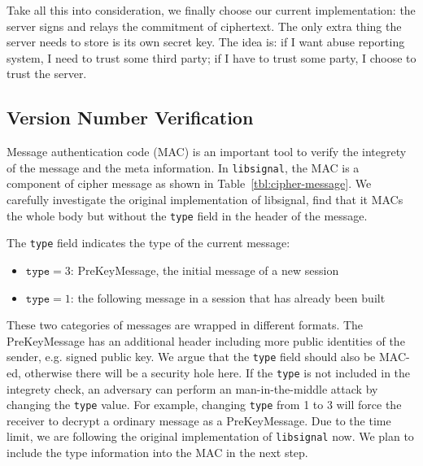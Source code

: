 Take all this into consideration, we finally choose our current implementation:
the server signs and relays the commitment of ciphertext.
The only extra thing the server needs to store is its own secret key.
The idea is: if I want abuse reporting system, I need to trust some third party;
if I have to trust some party, I choose to trust the server.

\subsection{Version Number Verification}
Message authentication code (MAC) is an important tool to verify the integrety of the message and the meta information.
In \texttt{libsignal}, the MAC is a component of cipher message as shown in Table~\ref{tbl:cipher-message}.
We carefully investigate the original implementation of libsignal,
find that it MACs the whole body but without the \texttt{type} field in the header of the message.

The \texttt{type} field indicates the type of the current message:
\begin{itemize}
\item $\texttt{type} = 3$: PreKeyMessage, the initial message of a new session
\item $\texttt{type} = 1$: the following message in a session that has already been built 
\end{itemize}
These two categories of messages are wrapped in different formats.
The PreKeyMessage has an additional header including more public identities of the sender,
e.g. signed public key.
We argue that the \texttt{type} field should also be MAC-ed,
otherwise there will be a security hole here.
If the \texttt{type} is not included in the integrety check,
an adversary can perform an man-in-the-middle attack by changing the \texttt{type} value.
For example, changing \texttt{type} from 1 to 3 will force the receiver to decrypt a ordinary message as a PreKeyMessage.
Due to the time limit, we are following the original implementation of \texttt{libsignal} now.
We plan to include the type information into the MAC in the next step.

